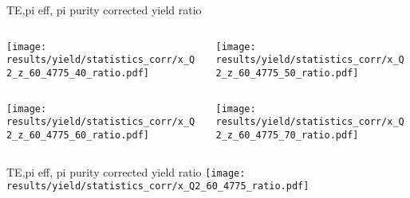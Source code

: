 \begin{frame}{TE,pi eff, pi purity corrected yield ratio}
\begin{columns}
\begin{column}[T]{0.5\textwidth}
\texttt{[image: results/yield/statistics\_corr/x\_Q2\_z\_60\_4775\_40\_ratio.pdf]}
\end{column}
\begin{column}[T]{0.5\textwidth}
\texttt{[image: results/yield/statistics\_corr/x\_Q2\_z\_60\_4775\_50\_ratio.pdf]}
\end{column}
\end{columns}
\begin{columns}
\begin{column}[T]{0.5\textwidth}
\texttt{[image: results/yield/statistics\_corr/x\_Q2\_z\_60\_4775\_60\_ratio.pdf]}
\end{column}
\begin{column}[T]{0.5\textwidth}
\texttt{[image: results/yield/statistics\_corr/x\_Q2\_z\_60\_4775\_70\_ratio.pdf]}
\end{column}
\end{columns}
\end{frame}
\begin{frame}{TE,pi eff, pi purity corrected yield ratio}
\texttt{[image: results/yield/statistics\_corr/x\_Q2\_60\_4775\_ratio.pdf]}
\end{frame}
